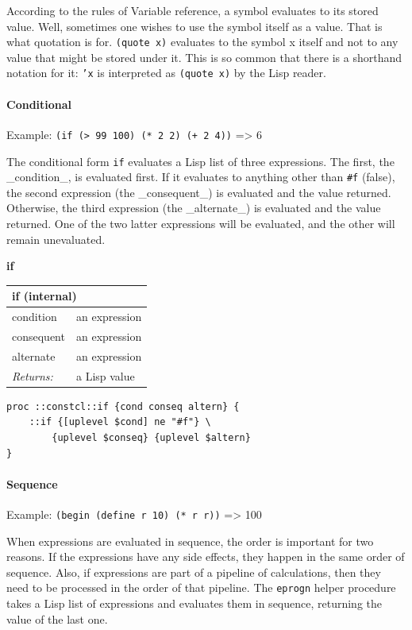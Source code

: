 \documentclass[twoside,9pt]{report}
\begin{document}
According to the rules of Variable reference, a symbol evaluates to its stored value. Well, sometimes one wishes to use the symbol itself as a value. That is what quotation is for. \texttt{(quote x)} evaluates to the symbol x itself and not to any value that might be stored under it. This is so common that there is a shorthand notation for it: \texttt{'x} is interpreted as \texttt{(quote x)} by the Lisp reader.

\paragraph{Conditional}
\label{conditional}

Example: \texttt{(if (> 99 100) (* 2 2) (+ 2 4))} => 6

The conditional form \texttt{if} evaluates a Lisp list of three expressions. The first, the \_condition\_, is evaluated first. If it evaluates to anything other than \texttt{\#f} (false), the second expression (the \_consequent\_) is evaluated and the value returned. Otherwise, the third expression (the \_alternate\_) is evaluated and the value returned. One of the two latter expressions will be evaluated, and the other will remain unevaluated.


\textbf{if}

\begin{tabular}{ |l l| }
\hline
\multicolumn{2}{|l|}{if (internal)} \\
\hline
condition & an expression \\
consequent & an expression \\
alternate & an expression \\
\textit{Returns:} & a Lisp value \\
\hline
\end{tabular}

\noindent\makebox[\linewidth]{\rule{\linewidth}{0.4pt}}
\begin{lstlisting}
proc ::constcl::if {cond conseq altern} {
    ::if {[uplevel $cond] ne "#f"} \
        {uplevel $conseq} {uplevel $altern}
}
\end{lstlisting}
\noindent\makebox[\linewidth]{\rule{\linewidth}{0.4pt}}
\paragraph{Sequence}
\label{sequence}

Example: \texttt{(begin (define r 10) (* r r))} => 100

When expressions are evaluated in sequence, the order is important for two reasons. If the expressions have any side effects, they happen in the same order of sequence. Also, if expressions are part of a pipeline of calculations, then they need to be processed in the order of that pipeline. The \texttt{eprogn} helper procedure takes a Lisp list of expressions and evaluates them in sequence, returning the value of the last one.
\end{document}
